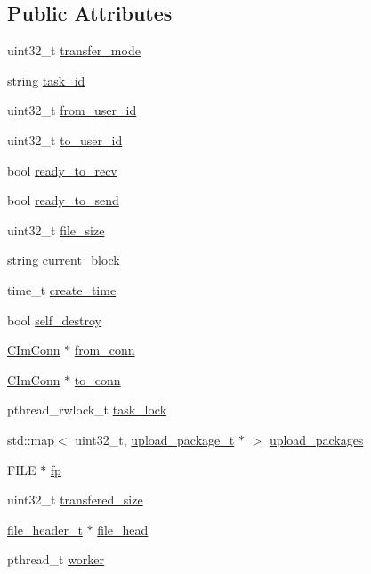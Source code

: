 \subsection*{Public Attributes}
\begin{DoxyCompactItemize}
\item 
uint32\+\_\+t \hyperlink{structtransfer__task__t_aa18fe39975838bbd013e998e415553d6}{transfer\+\_\+mode}
\item 
string \hyperlink{structtransfer__task__t_a84aefe856ac0516979ad6bc23c3ecc72}{task\+\_\+id}
\item 
uint32\+\_\+t \hyperlink{structtransfer__task__t_ac37251c2082573c456dcb7cdd83715d4}{from\+\_\+user\+\_\+id}
\item 
uint32\+\_\+t \hyperlink{structtransfer__task__t_aa83ca200d0a3a9506ccc56747baed732}{to\+\_\+user\+\_\+id}
\item 
bool \hyperlink{structtransfer__task__t_ade8b50d85e3841cad284b5d56412d6a6}{ready\+\_\+to\+\_\+recv}
\item 
bool \hyperlink{structtransfer__task__t_a13055582fac68304e08be922e7cf28b5}{ready\+\_\+to\+\_\+send}
\item 
uint32\+\_\+t \hyperlink{structtransfer__task__t_a4baea21aae99190e8470b9cd211a0c5c}{file\+\_\+size}
\item 
string \hyperlink{structtransfer__task__t_ae017d61b15ad01ddf6370c520c34b1b9}{current\+\_\+block}
\item 
time\+\_\+t \hyperlink{structtransfer__task__t_a95f9df09e2e08519ae8e8f38120b880e}{create\+\_\+time}
\item 
bool \hyperlink{structtransfer__task__t_a977f0bd17b925a3d2de63115e54553a8}{self\+\_\+destroy}
\item 
\hyperlink{class_c_im_conn}{C\+Im\+Conn} $\ast$ \hyperlink{structtransfer__task__t_a4c7b12647332e60715c0bf58d46f58da}{from\+\_\+conn}
\item 
\hyperlink{class_c_im_conn}{C\+Im\+Conn} $\ast$ \hyperlink{structtransfer__task__t_a174f3ff2ea40cc3fdef9b23ca708f429}{to\+\_\+conn}
\item 
pthread\+\_\+rwlock\+\_\+t \hyperlink{structtransfer__task__t_a5bde63b1aa3c433cf348f2c53749a706}{task\+\_\+lock}
\item 
std\+::map$<$ uint32\+\_\+t, \hyperlink{structupload__package__t}{upload\+\_\+package\+\_\+t} $\ast$ $>$ \hyperlink{structtransfer__task__t_a5f744614a5c5e68baf8190f39faba2b9}{upload\+\_\+packages}
\item 
F\+I\+L\+E $\ast$ \hyperlink{structtransfer__task__t_a90b53dedba891fb673bac05d6bdf427f}{fp}
\item 
uint32\+\_\+t \hyperlink{structtransfer__task__t_ac93c46acd00166eccb06f6241aaba292}{transfered\+\_\+size}
\item 
\hyperlink{structfile__header__t}{file\+\_\+header\+\_\+t} $\ast$ \hyperlink{structtransfer__task__t_a735a0022a8cf6f55a81a01f43dc6bc20}{file\+\_\+head}
\item 
pthread\+\_\+t \hyperlink{structtransfer__task__t_a0771c021831d5adc65590d6cfc3cf2eb}{worker}
\end{DoxyCompactItemize}


